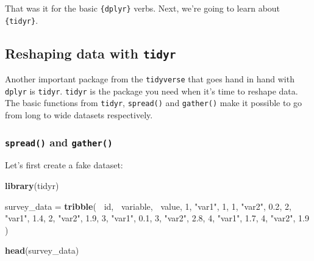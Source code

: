 \documentclass[]{gitbook}
\newenvironment{Shaded}{\begin{snugshade}}{\end{snugshade}}
\newcommand{\DecValTok}[1]{\textcolor[rgb]{0.00,0.00,0.81}{#1}}
\newcommand{\FloatTok}[1]{\textcolor[rgb]{0.00,0.00,0.81}{#1}}
\newcommand{\KeywordTok}[1]{\textcolor[rgb]{0.13,0.29,0.53}{\textbf{#1}}}
\newcommand{\NormalTok}[1]{#1}
\newcommand{\OperatorTok}[1]{\textcolor[rgb]{0.81,0.36,0.00}{\textbf{#1}}}
\newcommand{\StringTok}[1]{\textcolor[rgb]{0.31,0.60,0.02}{#1}}
\theoremstyle{definition}
\theoremstyle{definition}
\theoremstyle{definition}
\theoremstyle{remark}
\begin{document}
That was it for the basic \texttt{\{dplyr\}} verbs. Next, we're going to
learn about \texttt{\{tidyr\}}.

\hypertarget{reshaping-data-with-tidyr}{%
\subsection{\texorpdfstring{Reshaping data with
\texttt{tidyr}}{Reshaping data with tidyr}}\label{reshaping-data-with-tidyr}}

Another important package from the \texttt{tidyverse} that goes hand in
hand with \texttt{dplyr} is \texttt{tidyr}. \texttt{tidyr} is the
package you need when it's time to reshape data. The basic functions
from \texttt{tidyr}, \texttt{spread()} and \texttt{gather()} make it
possible to go from long to wide datasets respectively.

\hypertarget{spread-and-gather}{%
\subsubsection{\texorpdfstring{\texttt{spread()} and
\texttt{gather()}}{spread() and gather()}}\label{spread-and-gather}}

Let's first create a fake dataset:

\begin{Shaded}
\begin{Highlighting}[]
\KeywordTok{library}\NormalTok{(tidyr)}
\end{Highlighting}
\end{Shaded}

\begin{Shaded}
\begin{Highlighting}[]
\NormalTok{survey_data =}\StringTok{ }\KeywordTok{tribble}\NormalTok{(}
  \OperatorTok{~}\NormalTok{id, }\OperatorTok{~}\NormalTok{variable, }\OperatorTok{~}\NormalTok{value,}
  \DecValTok{1}\NormalTok{, }\StringTok{"var1"}\NormalTok{, }\DecValTok{1}\NormalTok{,}
  \DecValTok{1}\NormalTok{, }\StringTok{"var2"}\NormalTok{, }\FloatTok{0.2}\NormalTok{,}
  \DecValTok{2}\NormalTok{, }\StringTok{"var1"}\NormalTok{, }\FloatTok{1.4}\NormalTok{,}
  \DecValTok{2}\NormalTok{, }\StringTok{"var2"}\NormalTok{, }\FloatTok{1.9}\NormalTok{,}
  \DecValTok{3}\NormalTok{, }\StringTok{"var1"}\NormalTok{, }\FloatTok{0.1}\NormalTok{,}
  \DecValTok{3}\NormalTok{, }\StringTok{"var2"}\NormalTok{, }\FloatTok{2.8}\NormalTok{,}
  \DecValTok{4}\NormalTok{, }\StringTok{"var1"}\NormalTok{, }\FloatTok{1.7}\NormalTok{,}
  \DecValTok{4}\NormalTok{, }\StringTok{"var2"}\NormalTok{, }\FloatTok{1.9}
\NormalTok{)}

\KeywordTok{head}\NormalTok{(survey_data)}
\end{Highlighting}
\end{Shaded}
\end{document}
